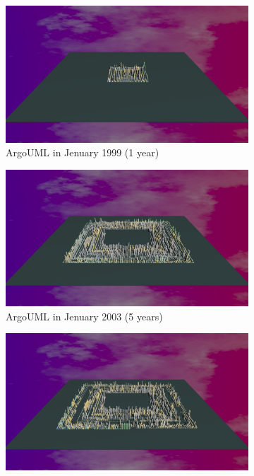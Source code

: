\begin{figure}[h!]
    \begin{subfigure}{0.48\textwidth}
        \includegraphics[width=\linewidth]{ArgoUML/Animation001.png}
        \caption{ArgoUML in Jenuary 1999 (1 year)} 
        \label{fig:ArgoUML_V3_S1}
    \end{subfigure}\hspace*{\fill}
    \begin{subfigure}{0.48\textwidth}
        \includegraphics[width=\linewidth]{ArgoUML/Animation005.png}
        \caption{ArgoUML in Jenuary 2003 (5 years)} 
        \label{fig:ArgoUML_V3_S2}
    \end{subfigure}
    \medskip
    \begin{subfigure}{0.48\textwidth}
        \includegraphics[width=\linewidth]{ArgoUML/Animation006.png}

\end{subfigure}
\end{figure}
